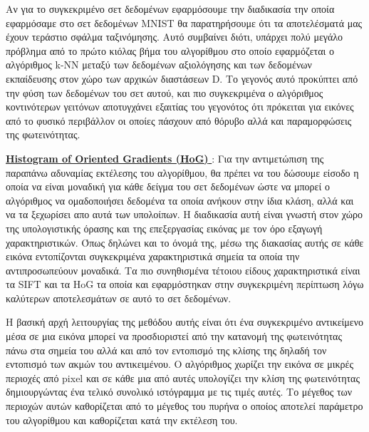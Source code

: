 \par
Αν για το συγκεκριμένο σετ δεδομένων εφαρμόσουμε την διαδικασία την οποία εφαρμόσαμε στο σετ δεδομένων \textlatin{MNIST}\textlatin{\cite{mnist}} θα παρατηρήσουμε ότι τα αποτελέσματά μας έχουν τεράστιο σφάλμα ταξινόμησης. Αυτό συμβαίνει διότι, υπάρχει πολύ μεγάλο πρόβλημα από το πρώτο κιόλας βήμα του αλγορίθμου στο οποίο εφαρμόζεται ο αλγόριθμος \textlatin{k-NN} μεταξύ των δεδομένων αξιολόγησης και των δεδομένων εκπαίδευσης στον χώρο των αρχικών διαστάσεων \textlatin{D}. Το γεγονός αυτό προκύπτει από την φύση των δεδομένων του σετ αυτού, και πιο συγκεκριμένα ο αλγόριθμος κοντινότερων γειτόνων αποτυγχάνει εξαιτίας του γεγονότος ότι πρόκειται για εικόνες από το φυσικό περιβάλλον οι οποίες πάσχουν από θόρυβο αλλά και παραμορφώσεις της φωτεινότητας. 
\par
\href{https://en.wikipedia.org/wiki/Histogram_of_oriented_gradients}{\textbf{\textlatin{Histogram of Oriented Gradients (HoG) }}}\textlatin{\cite{hog}}: Για την αντιμετώπιση της παραπάνω αδυναμίας εκτέλεσης του αλγορίθμου, θα πρέπει να του δώσουμε είσοδο η οποία να είναι μοναδική για κάθε δείγμα του σετ δεδομένων ώστε να μπορεί ο αλγόριθμος να ομαδοποιήσει δεδομένα τα οποία ανήκουν στην ίδια κλάση, αλλά και να τα ξεχωρίσει απο αυτά των υπολοίπων. Η διαδικασία αυτή είναι γνωστή στον χώρο της υπολογιστικής όρασης και της επεξεργασίας εικόνας με τον όρο εξαγωγή χαρακτηριστικών. Όπως δηλώνει και το όνομά της, μέσω της διακασίας αυτής σε κάθε εικόνα εντοπίζονται συγκεκριμένα χαρακτηριστικά σημεία τα οποία την αντιπροσωπεύουν μοναδικά. Τα πιο συνηθισμένα τέτοιου είδους χαρακτηριστικά είναι τα \textlatin{SIFT}\textlatin{\cite{sift}} και τα \textlatin{HoG}\textlatin{\cite{hog}} τα οποία και εφαρμόστηκαν στην συγκεκριμένη περίπτωση λόγω καλύτερων αποτελεσμάτων σε αυτό το σετ δεδομένων. 
\par
Η βασική αρχή λειτουργίας της μεθόδου αυτής είναι ότι ένα συγκεκριμένο αντικείμενο μέσα σε μια εικόνα μπορεί να προσδιοριστεί από την κατανομή της φωτεινότητας πάνω στα σημεία του αλλά και από τον εντοπισμό της κλίσης της δηλαδή τον εντοπισμό των ακμών του αντικειμένου. Ο αλγόριθμος χωρίζει την εικόνα σε μικρές περιοχές από \textlatin{pixel} και σε κάθε μια από αυτές υπολογίζει την κλίση της φωτεινότητας δημιουργώντας ένα τελικό συνολικό ιστόγραμμα με τις τιμές αυτές. Το μέγεθος των περιοχών αυτών καθορίζεται από το μέγεθος του πυρήνα ο οποίος αποτελεί παράμετρο του αλγορίθμου και καθορίζεται κατά την εκτέλεση του.

